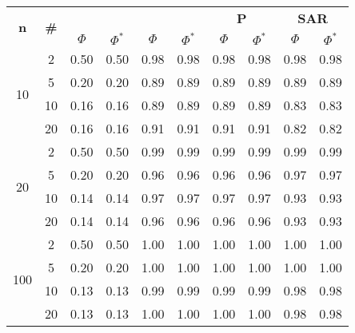 \begin{table}
\begin{small}
		\bigskip
		\begin{tabular}{|c|c|cc|cc|cc|cc|}
			\hline
			\multirow{2}{*}{\textbf{n}} &
			\multirow{2}{*}{\textbf{\#}} &
			\multicolumn{2}{c|}{\textbf{\astar}} &
			\multicolumn{2}{c|}{\textbf{\ambush}} &
			\multicolumn{2}{c|}{\textbf{P}} &
			\multicolumn{2}{c|}{\textbf{SAR}}\\
			& & $\Phi$ & $\Phi^*$ & $\Phi$ & $\Phi^*$&
			$\Phi$ & $\Phi^*$& $\Phi$ & $\Phi^*$\\
			\hline
			\multirow{4}{*}{10}
			 & 2 & 0.50 & 0.50 & 0.98 & 0.98 & 0.98 & 0.98 & 0.98 & 0.98\\
			 & 5 & 0.20 & 0.20 & 0.89 & 0.89 & 0.89 & 0.89 & 0.89 & 0.89\\
			 & 10 & 0.16 & 0.16 & 0.89 & 0.89 & 0.89 & 0.89 & 0.83 & 0.83\\
			 & 20 & 0.16 & 0.16 & 0.91 & 0.91 & 0.91 & 0.91 & 0.82 & 0.82\\
			\hline
			\multirow{4}{*}{20}
			 & 2 & 0.50 & 0.50 & 0.99 & 0.99 & 0.99 & 0.99 & 0.99 & 0.99\\
			 & 5 & 0.20 & 0.20 & 0.96 & 0.96 & 0.96 & 0.96 & 0.97 & 0.97\\
			 & 10 & 0.14 & 0.14 & 0.97 & 0.97 & 0.97 & 0.97 & 0.93 & 0.93\\
			 & 20 & 0.14 & 0.14 & 0.96 & 0.96 & 0.96 & 0.96 & 0.93 & 0.93\\
			 \hline
			\multirow{4}{*}{100}
			 & 2 & 0.50 & 0.50 & 1.00 & 1.00 & 1.00 & 1.00 & 1.00 & 1.00\\
			 & 5 & 0.20 & 0.20 & 1.00 & 1.00 & 1.00 & 1.00 & 1.00 & 1.00\\
		  	 & 10 & 0.13 & 0.13 & 0.99 & 0.99 & 0.99 & 0.99 & 0.98 & 0.98\\
			 & 20 & 0.13 & 0.13 & 1.00 & 1.00 & 1.00 & 1.00 & 0.98 & 0.98\\
			 \hline
		\end{tabular}
	\end{small}
\end{table}
